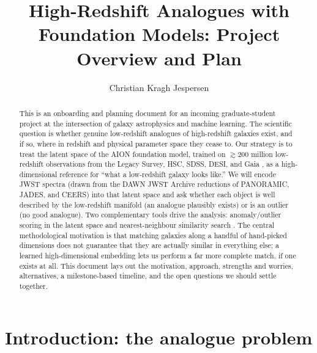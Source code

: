 \documentclass[onecolumn,astrosymb,tighten,longbib,trackchanges]{aastex7} %
\newcommand{\aion}{\textsc{AION}\xspace}
\begin{document}
\title{High-Redshift Analogues with Foundation Models: Project Overview and Plan}

\author[0000-0002-8896-6496, gname=Christian Kragh, sname=Jespersen]{Christian Kragh Jespersen}




\begin{abstract}
This is an onboarding and planning document for an incoming graduate-student project at the
intersection of galaxy astrophysics and machine learning. The scientific question is whether
genuine low-redshift analogues of high-redshift galaxies exist, and if so, where in redshift and
physical parameter space they cease to. Our strategy is to treat the latent space of the \aion
foundation model, trained on $\gtrsim\!200$ million low-redshift observations from the Legacy
Survey, HSC, SDSS, DESI, and Gaia \citep{Parker2025_AION_omnimodal}, as a high-dimensional reference
for ``what a low-redshift galaxy looks like.'' We will encode JWST spectra (drawn from the DAWN JWST
Archive reductions of PANORAMIC, JADES, and CEERS) into that latent space and ask whether each
object is well described by the low-redshift manifold (an analogue plausibly exists) or is an
outlier (no good analogue). Two complementary tools drive the analysis: anomaly/outlier scoring in
the latent space \citep{Liang2023_outlier_detection} and nearest-neighbour similarity search
\citep{Parker2025_AION_omnimodal}. The central methodological motivation is that matching galaxies
along a handful of hand-picked dimensions does not guarantee that they are actually similar in
everything else; a learned high-dimensional embedding lets us perform a far more complete match, if
one exists at all. This document lays out the motivation, approach, strengths and worries,
alternatives, a milestone-based timeline, and the open questions we should settle together.
\end{abstract}



\section{Introduction: the analogue problem} \label{sec:intro}
\end{document}
